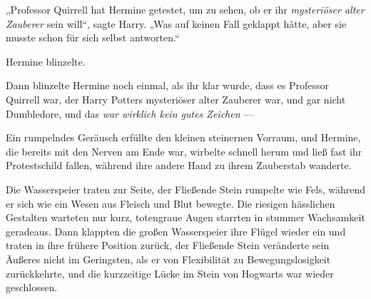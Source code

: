 „Professor Quirrell hat Hermine getestet, um zu sehen, ob er ihr \emph{mysteriöser alter Zauberer} sein will“, sagte Harry.
„Was auf keinen Fall geklappt hätte, aber sie musste schon für sich selbst antworten.“

Hermine blinzelte.

Dann blinzelte Hermine noch einmal, als ihr klar wurde, dass es Professor Quirrell war, der Harry Potters mysteriöser alter Zauberer war, und gar nicht Dumbledore, und das \emph{war wirklich kein gutes Zeichen} —

Ein rumpelndes Geräusch erfüllte den kleinen steinernen Vorraum, und Hermine, die bereits mit den Nerven am Ende war, wirbelte schnell herum und ließ fast ihr Protestschild fallen, während ihre andere Hand zu ihrem Zauberstab wanderte.

Die Wasserspeier traten zur Seite, der Fließende Stein rumpelte wie Fels, während er sich wie ein Wesen aus Fleisch und Blut bewegte. Die riesigen hässlichen Gestalten warteten nur kurz, totengraue Augen starrten in stummer Wachsamkeit geradeaus. Dann klappten die großen Wasserspeier ihre Flügel wieder ein und traten in ihre frühere Position zurück, der Fließende Stein veränderte sein Äußeres nicht im Geringsten, als er von Flexibilität zu Bewegungslosigkeit zurückkehrte, und die kurzzeitige Lücke im Stein von Hogwarts war wieder geschlossen.

